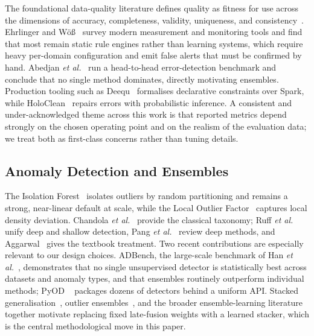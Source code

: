 \documentclass{ieeeaccess}
\begin{document}
The foundational data-quality literature defines quality as fitness for use
across the dimensions of accuracy, completeness, validity, uniqueness, and
consistency~\cite{redman1998impact, batini2009methodologies}. Ehrlinger and
W\"o{\ss}~\cite{ehrlinger2022survey} survey modern measurement and monitoring
tools and find that most remain static rule engines rather than learning systems,
which require heavy per-domain configuration and emit false alerts that must be
confirmed by hand. Abedjan \emph{et al.}~\cite{abedjan2016detecting} run a
head-to-head error-detection benchmark and conclude that no single method
dominates, directly motivating ensembles. Production tooling such as
Deequ~\cite{schelter2018automating} formalises declarative constraints over
Spark, while HoloClean~\cite{rekatsinas2017holoclean} repairs errors with
probabilistic inference. A consistent and under-acknowledged theme across this
work is that reported metrics depend strongly on the chosen operating point and
on the realism of the evaluation data; we treat both as first-class concerns
rather than tuning details.

\subsection{Anomaly Detection and Ensembles}

The Isolation Forest~\cite{liu2008isolation} isolates outliers by random
partitioning and remains a strong, near-linear default at scale, while the Local
Outlier Factor~\cite{breunig2000lof} captures local density deviation. Chandola
\emph{et al.}~\cite{chandola2009anomaly} provide the classical taxonomy; Ruff
\emph{et al.}~\cite{ruff2021unifying} unify deep and shallow detection, Pang
\emph{et al.}~\cite{pang2021deep} review deep methods, and
Aggarwal~\cite{aggarwal2017outlier} gives the textbook treatment. Two recent
contributions are especially relevant to our design choices. ADBench, the
large-scale benchmark of Han \emph{et al.}~\cite{han2022adbench}, demonstrates
that no single unsupervised detector is statistically best across datasets and
anomaly types, and that ensembles routinely outperform individual methods; PyOD
~\cite{zhao2019pyod} packages dozens of detectors behind a uniform API.
Stacked generalisation~\cite{wolpert1992stacked}, outlier
ensembles~\cite{aggarwal2017outlierensembles}, and the broader ensemble-learning
literature~\cite{sagi2018ensemble} together motivate replacing fixed late-fusion
weights with a learned stacker, which is the central methodological move in this
paper.
\end{document}
